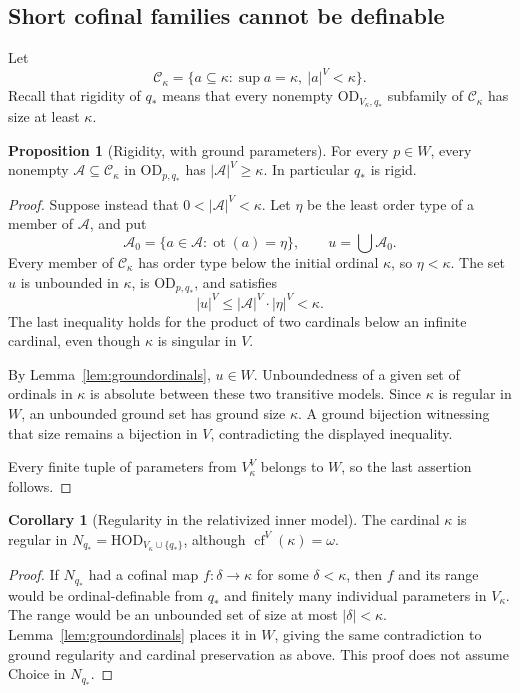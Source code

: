\documentclass[11pt,letterpaper]{article}
\theoremstyle{definition}
\newtheorem{proposition}[definition]{Proposition}
\newtheorem{corollary}[definition]{Corollary}
\numberwithin{equation}{section}
\newcommand{\HOD}{\mathrm{HOD}}
\newcommand{\OD}{\mathrm{OD}}
\newcommand{\cf}{\operatorname{cf}}
\newcommand{\ot}{\operatorname{ot}}
\begin{document}
\subsection{Short cofinal families cannot be definable}

Let
\[
 \mathcal C_\kappa=
   \{a\subseteq\kappa:\sup a=\kappa,\ |a|^V<\kappa\}.
\]
Recall that rigidity of $q_*$ means that every nonempty
$\OD_{V_\kappa,q_*}$ subfamily of $\mathcal C_\kappa$ has size at least
$\kappa$.

\begin{proposition}[Rigidity, with ground parameters]\label{prop:rigidity}
For every $p\in W$, every nonempty
$\mathscr A\subseteq\mathcal C_\kappa$ in $\OD_{p,q_*}$ has
$|\mathscr A|^V\ge\kappa$. In particular $q_*$ is rigid.
\end{proposition}

\begin{proof}
Suppose instead that $0<|\mathscr A|^V<\kappa$. Let $\eta$ be the least
order type of a member of $\mathscr A$, and put
\[
             \mathscr A_0=\{a\in\mathscr A:\ot(a)=\eta\},
             \qquad u=\bigcup\mathscr A_0.
\]
Every member of $\mathcal C_\kappa$ has order type below the initial ordinal
$\kappa$, so $\eta<\kappa$. The set $u$ is unbounded in $\kappa$, is
$\OD_{p,q_*}$, and satisfies
\[
                      |u|^V\le |\mathscr A|^V\cdot|\eta|^V<\kappa.
\]
The last inequality holds for the product of two cardinals below an
infinite cardinal, even though $\kappa$ is singular in $V$.

By Lemma~\ref{lem:groundordinals}, $u\in W$. Unboundedness of a given set of
ordinals in $\kappa$ is absolute between these two transitive models.
Since $\kappa$ is regular in $W$, an unbounded ground set has ground size
$\kappa$. A ground bijection witnessing that size remains a bijection in
$V$, contradicting the displayed inequality.

Every finite tuple of parameters from $V_\kappa^V$ belongs to $W$, so the
last assertion follows.
\end{proof}

\begin{corollary}[Regularity in the relativized inner model]\label{cor:regular}
The cardinal $\kappa$ is regular in
$N_{q_*}=\HOD_{V_\kappa\cup\{q_*\}}$, although $\cf^V(\kappa)=\omega$.
\end{corollary}

\begin{proof}
If $N_{q_*}$ had a cofinal map $f:\delta\to\kappa$ for some $\delta<\kappa$,
then $f$ and its range would be ordinal-definable from $q_*$ and finitely
many individual parameters in $V_\kappa$. The range would be an unbounded
set of size at most $|\delta|<\kappa$. Lemma~\ref{lem:groundordinals} places
it in $W$, giving the same contradiction to ground regularity and cardinal
preservation as above. This proof does not assume Choice in $N_{q_*}$.
\end{proof}
\end{document}
